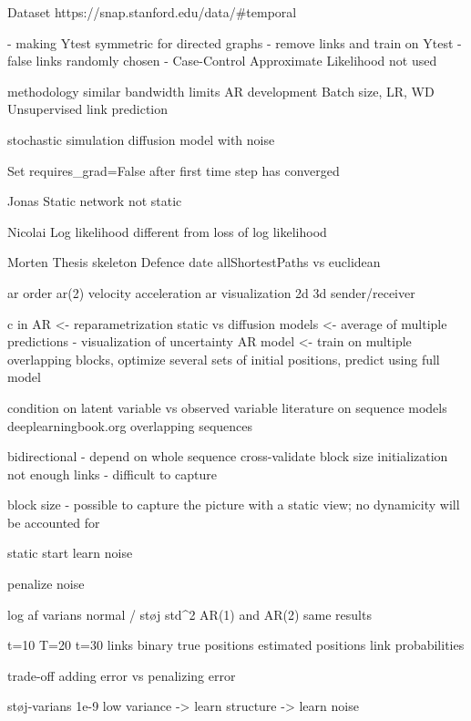 Dataset https://snap.stanford.edu/data/#temporal

- making Ytest symmetric for directed graphs
- remove links and train on Ytest
- false links randomly chosen
- Case-Control Approximate Likelihood not used

methodology similar
bandwidth limits
AR development
Batch size, LR, WD
Unsupervised link prediction

stochastic simulation
diffusion model with noise

Set requires_grad=False after first time step has converged

Jonas
    Static network not static
    
Nicolai
    Log likelihood different from loss of log likelihood
    
Morten
    Thesis skeleton
    Defence date
    allShortestPaths vs euclidean


ar order
ar(2) velocity acceleration
ar visualization 2d 3d sender/receiver

c in AR <- reparametrization
static vs diffusion models <- average of multiple predictions - visualization of uncertainty
AR model <- train on multiple overlapping blocks, optimize several sets of initial positions, predict using full model

condition on latent variable vs observed variable
literature on sequence models deeplearningbook.org
overlapping sequences


bidirectional - depend on whole sequence
cross-validate block size
initialization
not enough links - difficult to capture 

block size - possible to capture the picture with a static view; no dynamicity will be accounted for


static start 
learn noise


penalize noise

log af varians normal / støj std^2
AR(1) and AR(2) same results

t=10 T=20 t=30
links binary
true positions
estimated positions
link probabilities

trade-off
adding error vs penalizing error

støj-varians 1e-9
low variance -> learn structure -> learn noise
